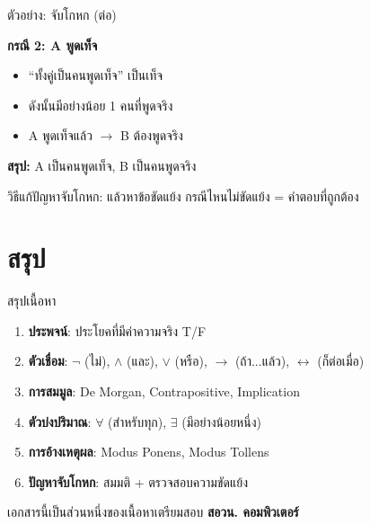 \documentclass[11pt, aspectratio=169]{beamer}
\begin{document}
\begin{frame}{ตัวอย่าง: จับโกหก (ต่อ)}
  \begin{solbox}[วิธีทำ (ต่อ)]
    \textbf{กรณี 2: A พูดเท็จ}
    \begin{itemize}
      \item ``ทั้งคู่เป็นคนพูดเท็จ'' เป็นเท็จ
      \item ดังนั้นมีอย่างน้อย 1 คนที่พูดจริง
      \item A พูดเท็จแล้ว $\rightarrow$ B ต้องพูดจริง
    \end{itemize}

    \textbf{สรุป:} A เป็นคนพูดเท็จ, B เป็นคนพูดจริง
  \end{solbox}

  \begin{intuition}[เทคนิค]
    วิธีแก้ปัญหาจับโกหก:  แล้วหาข้อขัดแย้ง
    กรณีไหนไม่ขัดแย้ง = คำตอบที่ถูกต้อง
  \end{intuition}
\end{frame}

\section{สรุป}

\begin{frame}{สรุปเนื้อหา}
  \begin{explanation}[สิ่งที่ได้เรียนรู้]
    \begin{enumerate}
      \item \textbf{ประพจน์}: ประโยคที่มีค่าความจริง T/F
      \item \textbf{ตัวเชื่อม}: $\lnot$ (ไม่), $\land$ (และ), $\lor$ (หรือ), $\to$ (ถ้า...แล้ว), $\leftrightarrow$ (ก็ต่อเมื่อ)
      \item \textbf{การสมมูล}: De Morgan, Contrapositive, Implication
      \item \textbf{ตัวบ่งปริมาณ}: $\forall$ (สำหรับทุก), $\exists$ (มีอย่างน้อยหนึ่ง)
      \item \textbf{การอ้างเหตุผล}: Modus Ponens, Modus Tollens
      \item \textbf{ปัญหาจับโกหก}: สมมติ + ตรวจสอบความขัดแย้ง
    \end{enumerate}
  \end{explanation}

  \begin{center}
    \large เอกสารนี้เป็นส่วนหนึ่งของเนื้อหาเตรียมสอบ \textbf{สอวน. คอมพิวเตอร์}
  \end{center}
\end{frame}
\end{document}
